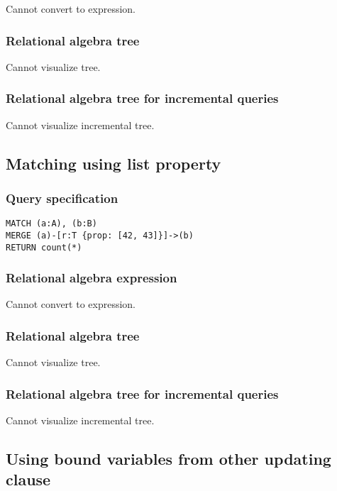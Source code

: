 Cannot convert to expression.

\subsubsection*{Relational algebra tree}

Cannot visualize tree.

\subsubsection*{Relational algebra tree for incremental queries}

Cannot visualize incremental tree.

\subsection{Matching using list property}

\subsubsection*{Query specification}

\begin{lstlisting}
MATCH (a:A), (b:B)
MERGE (a)-[r:T {prop: [42, 43]}]->(b)
RETURN count(*)
\end{lstlisting}

\subsubsection*{Relational algebra expression}

Cannot convert to expression.

\subsubsection*{Relational algebra tree}

Cannot visualize tree.

\subsubsection*{Relational algebra tree for incremental queries}

Cannot visualize incremental tree.

\subsection{Using bound variables from other updating clause}

